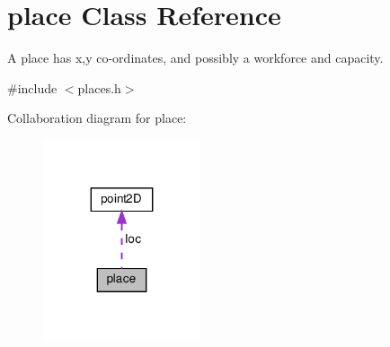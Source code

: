 \hypertarget{classplace}{}\section{place Class Reference}
\label{classplace}


A place has x,y co-\/ordinates, and possibly a workforce and capacity.  




{\ttfamily \#include $<$places.\+h$>$}



Collaboration diagram for place\+:\nopagebreak
\begin{figure}[H]
\begin{center}
\leavevmode
\includegraphics[width=131pt]{classplace__coll__graph}
\end{center}
\end{figure}
